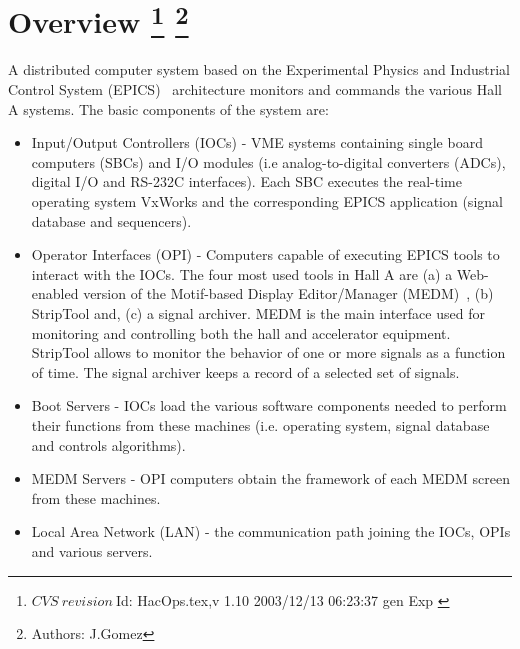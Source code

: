 \chapter[Overview]{Overview
\footnote{
  $CVS~revision~ $Id: HacOps.tex,v 1.10 2003/12/13 06:23:37 gen Exp $ $
}
\footnote{Authors: J.Gomez }
}
\label{chap:controls}

A distributed computer system
based on the 
Experimental Physics and Industrial Control System 
(EPICS)~\cite{EPICSwww}
 architecture monitors and commands
the various Hall A systems. The basic components of the system are:
\begin{itemize}
\item Input/Output Controllers (IOCs) - VME systems containing single
board computers (SBCs) and I/O modules
(i.e analog-to-digital converters (ADCs), digital I/O and RS-232C interfaces).
Each SBC executes the real-time operating system VxWorks and the corresponding EPICS application (signal database
and sequencers).
\item Operator Interfaces (OPI) - Computers capable of executing
EPICS tools to interact with the IOCs.
The four most used tools in Hall A are (a)
a Web-enabled version of the Motif-based Display Editor/Manager (MEDM)~\cite{MEDMwww}, 
(b) StripTool and, (c) a signal archiver.
MEDM is the main interface used for monitoring and controlling both the hall and accelerator
equipment. StripTool allows to monitor 
the behavior of one or more signals as a function of time. 
The signal archiver keeps a record of a selected set of signals.
\item Boot Servers - IOCs load the various
software components needed to perform their functions from these machines (i.e. operating system,
signal database and controls algorithms).
\item MEDM Servers - OPI computers obtain the framework of each MEDM screen from these machines.
\item Local Area Network (LAN) - the communication path joining the IOCs, OPIs and various servers.
\end{itemize}


